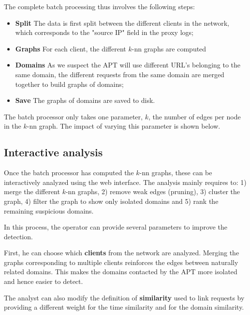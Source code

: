 \documentclass[conference]{IEEEtran}
\begin{document}


The complete batch processing thus involves the following steps:

\begin{itemize}
\item \textbf{Split} The data is first split between the different clients in the network, which corresponds to the "source IP" field in the proxy logs;
\item \textbf{Graphs} For each client, the different $k$-nn graphs are computed
\item \textbf{Domains} As we suspect the APT will use different URL's belonging to the same domain, the different requests from the same domain are merged together to build graphs of domains;
\item \textbf{Save} The graphs of domains are saved to disk.
\end{itemize}

The batch processor only takes one parameter, $k$, the number of edges per node in the $k$-nn graph. The impact of varying this parameter is shown below.

\subsection{Interactive analysis}

Once the batch processor has computed the $k$-nn graphs, these can be interactively analyzed using the web interface. The analysis mainly requires to: 1) merge the different $k$-nn graphs, 2) remove weak edges (pruning), 3) cluster the graph, 4) filter the graph to show only isolated domains and 5) rank the remaining suspicious domains.

In this process, the operator can provide several parameters to improve the detection.

First, he can choose which \textbf{clients} from the network are analyzed. Merging the graphs corresponding to multiple clients reinforces the edges between naturally related domains. This makes the domains contacted by the APT more isolated and hence easier to detect.

The analyst can also modify the definition of \textbf{similarity} used to link requests by providing a different weight for the time similarity and for the domain similarity.
\end{document}
